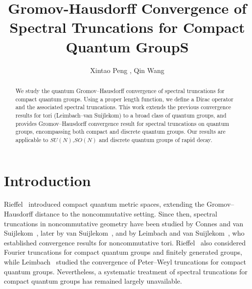 \documentclass[12pt, reqno]{amsart}
\theoremstyle{definition}
\theoremstyle{remark}
\numberwithin{equation}{section}
\begin{document}
\setcounter{page}{1}



\centerline{}

\centerline{}



\title[GH convergence of spectral truncation for  compact quantum groupS]{Gromov-Hausdorff Convergence of Spectral Truncations for Compact  Quantum GroupS
}

\author{Xintao Peng , Qin Wang}





\begin{abstract}


We study the quantum Gromov–Hausdorff convergence of spectral truncations for compact quantum groups. Using a proper length function, we define a Dirac operator and the associated spectral truncations. This work extends the previous convergence results for tori (Leimbach–van Suijlekom) to a broad class of quantum groups, and provides Gromov–Hausdorff convergence result for spectral truncations on quantum groups, encompassing both compact  and discrete quantum groups. Our results are applicable to $SU(N)$,$SO(N)$ and discrete quantum groups of rapid decay.
\end{abstract}

\maketitle


\section{Introduction}







Rieffel~\cite{9} introduced compact quantum metric spaces, extending the Gromov--Hausdorff distance to the noncommutative setting. Since then, spectral truncations in noncommutative geometry have been studied by Connes and van Suijlekom~\cite{1}, later by van Suijlekom~\cite{5}, and by Leimbach and van Suijlekom~\cite{4}, who established convergence results for noncommutative tori. Rieffel~\cite{11} also considered Fourier truncations for compact quantum groups and finitely generated groups, while Leimbach~\cite{6} studied the convergence of Peter--Weyl truncations for compact quantum groups. Nevertheless, a systematic treatment of spectral truncations for compact quantum groups has remained largely unavailable.
\end{document}
